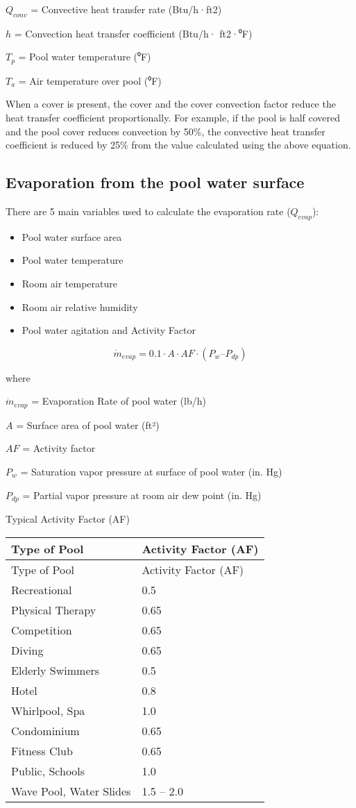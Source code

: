 \(Q_{conv}\) = Convective heat transfer rate (Btu/h·ft2)

\(h\) = Convection heat transfer coefficient (Btu/h· ft2·⁰F)

\(T_p\) = Pool water temperature (⁰F)

\(T_a\) = Air temperature over pool (⁰F)

When a cover is present, the cover and the cover convection factor reduce the heat transfer coefficient proportionally. For example, if the pool is half covered and the pool cover reduces convection by 50\%, the convective heat transfer coefficient is reduced by 25\% from the value calculated using the above equation.

\subsection{Evaporation from the pool water surface}\label{evaporation-from-the-pool-water-surface}

There are 5 main variables used to calculate the evaporation rate (\(Q_{evap}\)):

\begin{itemize}
\tightlist
\item
  Pool water surface area
\item
  Pool water temperature
\item
  Room air temperature
\item
  Room air relative humidity
\item
  Pool water agitation and Activity Factor
\end{itemize}

\begin{equation}
\dot{m}_{evap} = 0.1 \cdot A \cdot AF \cdot (P_w – P_{dp})
\end{equation}

where

\(\dot{m}_{evap}\) = Evaporation Rate of pool water (lb/h)

\(A\) = Surface area of pool water (ft²)

\(AF\) = Activity factor

\(P_w\) = Saturation vapor pressure at surface of pool water (in. Hg)

\(P_{dp}\) = Partial vapor pressure at room air dew point (in. Hg)

Typical Activity Factor (AF)

\begin{longtable}[c]{@{}ll@{}}
\toprule 
Type of Pool & Activity Factor (AF) \tabularnewline
\midrule
\endfirsthead

\toprule 
Type of Pool & Activity Factor (AF) \tabularnewline
\midrule
\endhead

Recreational & 0.5 \tabularnewline
Physical Therapy & 0.65 \tabularnewline
Competition & 0.65 \tabularnewline
Diving & 0.65 \tabularnewline
Elderly Swimmers & 0.5 \tabularnewline
Hotel & 0.8 \tabularnewline
Whirlpool, Spa & 1.0 \tabularnewline
Condominium & 0.65 \tabularnewline
Fitness Club & 0.65 \tabularnewline
Public, Schools & 1.0 \tabularnewline
Wave Pool, Water Slides & 1.5 – 2.0 \tabularnewline
\bottomrule
\end{longtable}

